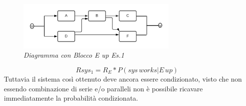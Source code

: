\begin{figure}[H]
	\centering
	\includegraphics[width=0.7\textwidth]{img/hw5/e_up.png}
	\caption{\textit{Diagramma con Blocco E up Es.1}}
\end{figure}
\begin{equation*}
	Rsys_1 = R_E*P(sys\,works|E\,up)
\end{equation*}
Tuttavia il sistema così ottenuto deve ancora essere condizionato, visto che non essendo combinazione di serie e/o paralleli non è possibile ricavare immediatamente la probabilità condizionata.
